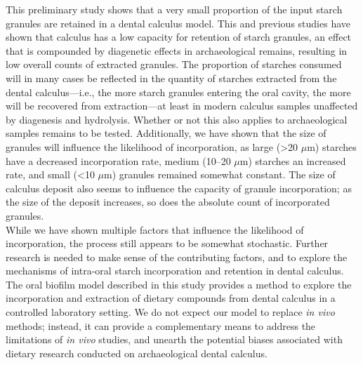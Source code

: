 \documentclass[
  letterpaper,
]{book}
\begin{document}
This preliminary study shows that a very small proportion of the input
starch granules are retained in a dental calculus model. This and
previous studies have shown that calculus has a low capacity for
retention of starch granules, an effect that is compounded by diagenetic
effects in archaeological remains, resulting in low overall counts of
extracted granules. The proportion of starches consumed will in many
cases be reflected in the quantity of starches extracted from the dental
calculus---i.e., the more starch granules entering the oral cavity, the
more will be recovered from extraction---at least in modern calculus
samples unaffected by diagenesis and hydrolysis. Whether or not this
also applies to archaeological samples remains to be tested.
Additionally, we have shown that the size of granules will influence the
likelihood of incorporation, as large (\textgreater20 \(\mu\)m) starches
have a decreased incorporation rate, medium (10--20 \(\mu\)m) starches
an increased rate, and small (\textless10 \(\mu\)m) granules remained
somewhat constant. The size of calculus deposit also seems to influence
the capacity of granule incorporation; as the size of the deposit
increases, so does the absolute count of incorporated granules.\\
While we have shown multiple factors that influence the likelihood of
incorporation, the process still appears to be somewhat stochastic.
Further research is needed to make sense of the contributing factors,
and to explore the mechanisms of intra-oral starch incorporation and
retention in dental calculus. The oral biofilm model described in this
study provides a method to explore the incorporation and extraction of
dietary compounds from dental calculus in a controlled laboratory
setting. We do not expect our model to replace \emph{in vivo} methods;
instead, it can provide a complementary means to address the limitations
of \emph{in vivo} studies, and unearth the potential biases associated
with dietary research conducted on archaeological dental calculus.
\end{document}

